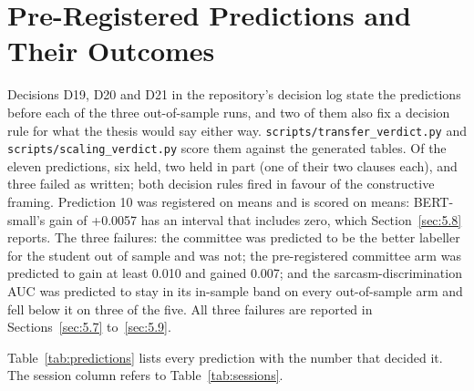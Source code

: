 \chapter{Pre-Registered Predictions and Their Outcomes}

\label{app:predictions}

Decisions D19, D20 and D21 in the repository's decision log state the predictions before each of the
three out-of-sample runs, and two of them also fix a decision rule for what the thesis would say
either way. \texttt{scripts/transfer\_verdict.py} and \texttt{scripts/scaling\_verdict.py} score
them against the generated tables. Of the eleven predictions, six held, two held in part (one of
their two clauses each), and three failed as written; both decision rules fired in favour of the
constructive framing. Prediction 10 was registered on means and is scored on means: BERT-small's
gain of +0.0057 has an interval that includes zero, which Section~\ref{sec:5.8} reports. The three
failures: the committee was predicted to be the better labeller for the student out of sample and
was not; the pre-registered committee arm was predicted to gain at least 0.010 and gained 0.007; and
the sarcasm-discrimination AUC was predicted to stay in its in-sample band on every out-of-sample
arm and fell below it on three of the five. All three failures are reported in
Sections~\ref{sec:5.7} to~\ref{sec:5.9}.

Table~\ref{tab:predictions} lists every prediction with the number that decided it. The session
column refers to Table~\ref{tab:sessions}.


